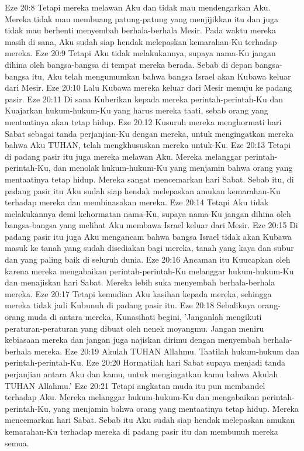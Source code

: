 Eze 20:8  Tetapi mereka melawan Aku dan tidak mau mendengarkan Aku. Mereka tidak mau membuang patung-patung yang menjijikkan itu dan juga tidak mau berhenti menyembah berhala-berhala Mesir. Pada waktu mereka masih di sana, Aku sudah siap hendak melepaskan kemarahan-Ku terhadap mereka.
Eze 20:9  Tetapi Aku tidak melakukannya, supaya nama-Ku jangan dihina oleh bangsa-bangsa di tempat mereka berada. Sebab di depan bangsa-bangsa itu, Aku telah mengumumkan bahwa bangsa Israel akan Kubawa keluar dari Mesir.
Eze 20:10  Lalu Kubawa mereka keluar dari Mesir menuju ke padang pasir.
Eze 20:11  Di sana Kuberikan kepada mereka perintah-perintah-Ku dan Kuajarkan hukum-hukum-Ku yang harus mereka taati, sebab orang yang mentaatinya akan tetap hidup.
Eze 20:12  Kusuruh mereka menghormati hari Sabat sebagai tanda perjanjian-Ku dengan mereka, untuk mengingatkan mereka bahwa Aku TUHAN, telah mengkhususkan mereka untuk-Ku.
Eze 20:13  Tetapi di padang pasir itu juga mereka melawan Aku. Mereka melanggar perintah-perintah-Ku, dan menolak hukum-hukum-Ku yang menjamin bahwa orang yang mentaatinya tetap hidup. Mereka sangat mencemarkan hari Sabat. Sebab itu, di padang pasir itu Aku sudah siap hendak melepaskan amukan kemarahan-Ku terhadap mereka dan membinasakan mereka.
Eze 20:14  Tetapi Aku tidak melakukannya demi kehormatan nama-Ku, supaya nama-Ku jangan dihina oleh bangsa-bangsa yang melihat Aku membawa Israel keluar dari Mesir.
Eze 20:15  Di padang pasir itu juga Aku mengancam bahwa bangsa Israel tidak akan Kubawa masuk ke tanah yang sudah disediakan bagi mereka, tanah yang kaya dan subur dan yang paling baik di seluruh dunia.
Eze 20:16  Ancaman itu Kuucapkan oleh karena mereka mengabaikan perintah-perintah-Ku melanggar hukum-hukum-Ku dan menajiskan hari Sabat. Mereka lebih suka menyembah berhala-berhala mereka.
Eze 20:17  Tetapi kemudian Aku kasihan kepada mereka, sehingga mereka tidak jadi Kubunuh di padang pasir itu.
Eze 20:18  Sebaliknya orang-orang muda di antara mereka, Kunasihati begini, 'Janganlah mengikuti peraturan-peraturan yang dibuat oleh nenek moyangmu. Jangan meniru kebiasaan mereka dan jangan juga najiskan dirimu dengan menyembah berhala-berhala mereka.
Eze 20:19  Akulah TUHAN Allahmu. Taatilah hukum-hukum dan perintah-perintah-Ku.
Eze 20:20  Hormatilah hari Sabat supaya menjadi tanda perjanjian antara Aku dan kamu, untuk mengingatkan kamu bahwa Akulah TUHAN Allahmu.'
Eze 20:21  Tetapi angkatan muda itu pun membandel terhadap Aku. Mereka melanggar hukum-hukum-Ku dan mengabaikan perintah-perintah-Ku, yang menjamin bahwa orang yang mentaatinya tetap hidup. Mereka mencemarkan hari Sabat. Sebab itu Aku sudah siap hendak melepaskan amukan kemarahan-Ku terhadap mereka di padang pasir itu dan membunuh mereka semua.
